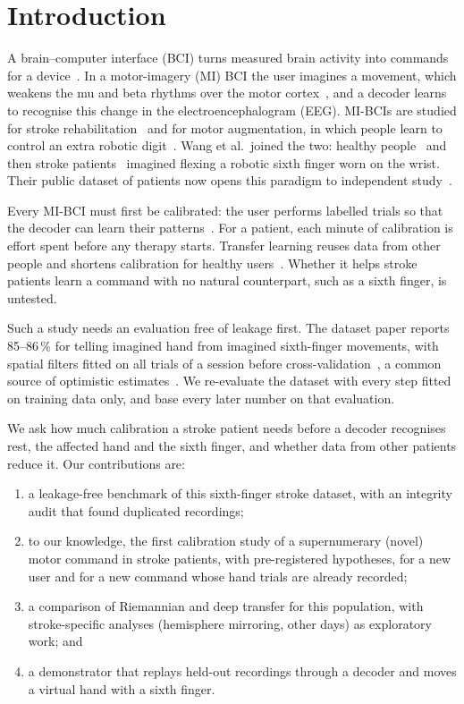 \section{Introduction}
\label{sec:intro}
A brain--computer interface (BCI) turns measured brain activity into commands
for a device~\cite{wolpaw2002}. In a motor-imagery (MI) BCI the user imagines
a movement, which weakens the mu and beta rhythms over the motor
cortex~\cite{pfurtscheller1999,pfurtscheller2001}, and a decoder learns to
recognise this change in the electroencephalogram (EEG). MI-BCIs are studied
for stroke rehabilitation~\cite{cervera2018,biasiucci2018} and for motor
augmentation, in which people learn to control an extra robotic
digit~\cite{kieliba2021,eden2022}. Wang et al.\ joined the two: healthy
people~\cite{wang2024jbhi} and then stroke patients~\cite{wang2024tnsre}
imagined flexing a robotic sixth finger worn on the wrist. Their public
dataset of \nSubjects{} patients now opens this paradigm to independent
study~\cite{wang2026dataset}.

Every MI-BCI must first be calibrated: the user performs labelled trials so
that the decoder can learn their patterns~\cite{lotte2015}. For a patient,
each minute of calibration is effort spent before any therapy starts.
Transfer learning reuses data from other people and shortens calibration for
healthy users~\cite{zanini2018,he2020,wu2022review}. Whether it helps stroke
patients learn a command with no natural counterpart, such as a sixth
finger, is untested.

Such a study needs an evaluation free of leakage first. The dataset paper
reports 85--86\,\% for telling imagined hand from imagined sixth-finger
movements, with spatial filters fitted on all trials of a session before
cross-validation~\cite{wang2026dataset}, a common source of optimistic
estimates~\cite{kapoor2023,brookshire2024}. We re-evaluate the dataset with
every step fitted on training data only, and base every later number on
that evaluation.

We ask how much calibration a stroke patient needs before a decoder
recognises rest, the affected hand and the sixth finger, and whether data
from other patients reduce it. Our contributions are:
\begin{enumerate}
  \item a leakage-free benchmark of this sixth-finger stroke dataset, with an
        integrity audit that found duplicated recordings;
  \item to our knowledge, the first calibration study of a supernumerary
        (novel) motor command in stroke patients, with pre-registered
        hypotheses, for a new user and for a new command whose hand trials
        are already recorded;
  \item a comparison of Riemannian and deep transfer for this population,
        with stroke-specific analyses (hemisphere mirroring, other days) as
        exploratory work; and
  \item a demonstrator that replays held-out recordings through a decoder and
        moves a virtual hand with a sixth finger.
\end{enumerate}
